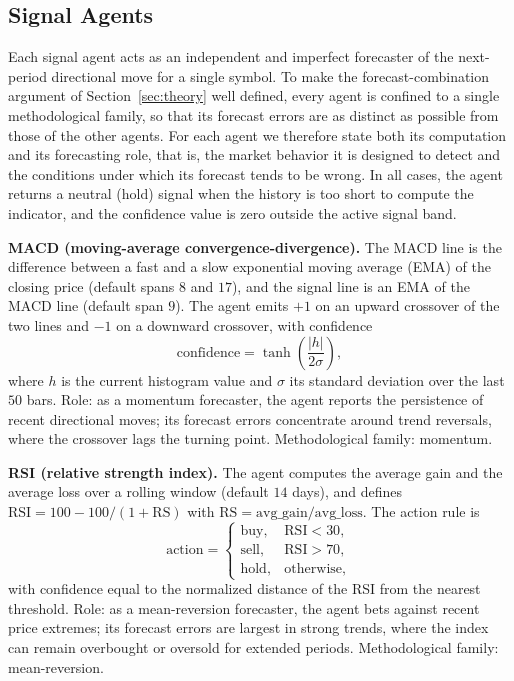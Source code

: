 \documentclass{ieeeaccess}
\begin{document}
\subsection{Signal Agents}

Each signal agent acts as an independent and imperfect forecaster of the next-period directional move for a single symbol. To make the forecast-combination argument of Section~\ref{sec:theory} well defined, every agent is confined to a single methodological family, so that its forecast errors are as distinct as possible from those of the other agents. For each agent we therefore state both its computation and its forecasting role, that is, the market behavior it is designed to detect and the conditions under which its forecast tends to be wrong. In all cases, the agent returns a neutral (hold) signal when the history is too short to compute the indicator, and the confidence value is zero outside the active signal band.

\textbf{MACD (moving-average convergence-divergence).} The MACD line is the difference between a fast and a slow exponential moving average (EMA) of the closing price (default spans $8$ and $17$), and the signal line is an EMA of the MACD line (default span $9$). The agent emits $+1$ on an upward crossover of the two lines and $-1$ on a downward crossover, with confidence
\begin{equation}
\mathrm{confidence} = \tanh\!\left(\frac{|h|}{2\sigma}\right),
\end{equation}
where $h$ is the current histogram value and $\sigma$ its standard deviation over the last $50$ bars. Role: as a momentum forecaster, the agent reports the persistence of recent directional moves; its forecast errors concentrate around trend reversals, where the crossover lags the turning point. Methodological family: momentum.

\textbf{RSI (relative strength index).} The agent computes the average gain and the average loss over a rolling window (default $14$ days), and defines $\mathrm{RSI} = 100 - 100/(1 + \mathrm{RS})$ with $\mathrm{RS} = \mathrm{avg\_gain}/\mathrm{avg\_loss}$. The action rule is
\begin{equation}
\mathrm{action} =
\begin{cases}
\mathrm{buy}, & \mathrm{RSI} < 30, \\
\mathrm{sell}, & \mathrm{RSI} > 70, \\
\mathrm{hold}, & \mathrm{otherwise},
\end{cases}
\end{equation}
with confidence equal to the normalized distance of the RSI from the nearest threshold. Role: as a mean-reversion forecaster, the agent bets against recent price extremes; its forecast errors are largest in strong trends, where the index can remain overbought or oversold for extended periods. Methodological family: mean-reversion.
\end{document}
